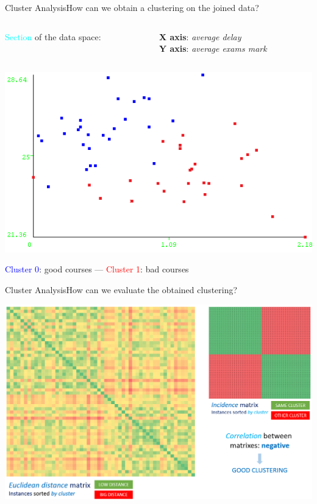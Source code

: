 \begin{frame}{Cluster Analysis}{How can we obtain a clustering on the joined data?}

 \vspace{0.2cm}
\begin{columns}
\begin{column}{0.5\textwidth}
   \textcolor{cyan}{Section} of the data space:
\end{column}
\begin{column}{0.5\textwidth}
     \textbf{X axis}: \emph{average delay} \\ \textbf{Y axis}: \emph{average exams mark}
\end{column}
\end{columns}

    \vspace{0.1cm}
    \begin{centering}
        \hspace{0.5cm}\includegraphics[scale=0.65]{cluster1.png}
    \end{centering}

    \textcolor{blue}{Cluster 0}: good courses --- \textcolor{red}{Cluster 1}: bad courses

\end{frame}

\begin{frame}{Cluster Analysis}{How can we evaluate the obtained clustering?}

\vspace{0.3cm}
\begin{centering}
    \includegraphics[scale=0.25]{cluster5_nocorr.png}
\end{centering}

\end{frame}
